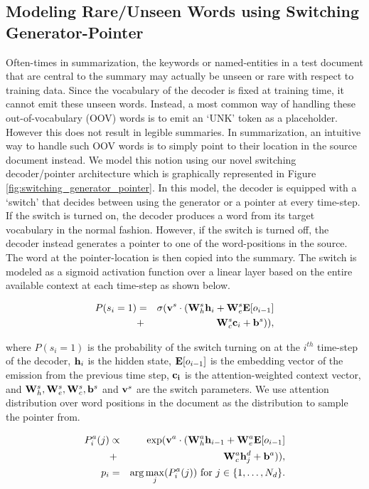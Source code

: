 \subsection{Modeling Rare/Unseen Words using Switching Generator-Pointer}\label{sec:switch}
Often-times in summarization, the keywords or named-entities in a test document that are central to the summary may actually be unseen or rare with respect to training data. Since the vocabulary of the decoder is fixed at training time, it cannot emit these unseen words. Instead, a most common way of handling these out-of-vocabulary (OOV) words is to emit  an `UNK' token as a placeholder. However this does not result in legible summaries. In summarization, an intuitive way to handle such OOV words is to simply point to their location in the source document instead. We model this notion using our novel switching decoder/pointer architecture which is graphically represented in Figure \ref{fig:switching_generator_pointer}. In this model, the decoder is equipped with a `switch' that decides between using the generator or a pointer at every time-step. If the switch is turned on, the decoder produces a word from its target vocabulary in the normal fashion. However, if the switch is turned off, the decoder instead generates a pointer to one of the word-positions in the source. The word at the pointer-location is then copied into the summary.  The switch is modeled as a sigmoid activation function over a linear layer based on the entire available context at each time-step as shown below.

\begin{eqnarray}
P(s_i=1) &=& \sigma({{\bf v}^s}\cdot({\bf W}^s_h{\bf h}_i + {\bf W}^s_e{\bf E}[o_{i-1}] \nonumber\\
             &+& {\bf W}^s_c{\bf c}_i + {\bf b}^s)),\nonumber
\end{eqnarray}

where $P(s_i=1)$ is the probability of the switch turning on at the $i^{th}$ time-step of the decoder, ${\bf h}_i$ is the hidden state,  ${\bf E}[o_{i-1}]$ is the embedding vector of the emission from the previous time step, ${\bf c_i}$ is the attention-weighted context vector, and ${\bf W}_h^s, {\bf W}_e^s, {\bf W}_c^s, {\bf b}^s$ and ${\bf v}^s$ are the switch parameters. We use attention distribution over word positions in the document as the distribution to sample the pointer from.

\begin{eqnarray}
P^a_i(j)    &\propto&  \exp({{\bf v}^a}\cdot({\bf W}_h^a{\bf h}_{i-1} + {\bf W}^a_e{\bf E}[o_{i-1}] \nonumber\\
            &+& {\bf W}^a_c{\bf h}^d_j + {\bf b}^a)), \nonumber \\
 p_i &=& \arg\max_j (P^a_i(j))~\mbox{for}~j \in \{1,\ldots,N_d\}\nonumber.
\end{eqnarray}

